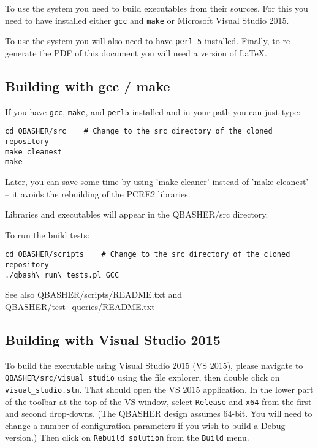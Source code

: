 \documentclass{article}
\begin{document}
To use the system you need to build executables from their sources.
For this you need to have installed either \texttt{gcc} and
\texttt{make} or Microsoft Visual Studio 2015.

To use the system you will also need to have \texttt{perl 5}
installed.  Finally, to re-generate the PDF of this document you will
need a version of LaTeX.

\subsection{Building with gcc / make}

If you have \texttt{gcc}, \texttt{make}, and \texttt{perl5} installed
and in your path you can just type:

\begin{verbatim}
cd QBASHER/src    # Change to the src directory of the cloned repository
make cleanest
make
\end{verbatim}

Later, you can save some time by using 'make cleaner' instead of 'make
cleanest' -- it avoids the rebuilding of the PCRE2 libraries.

Libraries and executables will appear in the QBASHER/src directory.

\noindent To run the build tests:

\begin{verbatim}
cd QBASHER/scripts    # Change to the src directory of the cloned repository
./qbash\_run\_tests.pl GCC
\end{verbatim}

See also QBASHER/scripts/README.txt and QBASHER/test\_queries/README.txt


\subsection{Building with Visual Studio 2015}

To build the executable using Visual Studio 2015 (VS 2015), please navigate to
\texttt{QBASHER/src/visual\_studio} using the file explorer, then
double click on \texttt{visual\_studio.sln}. That should open the VS
2015 application.  In the lower part of the toolbar at the top
of the VS window, select \texttt{Release} and \texttt{x64} from the
first and second drop-downs.  (The QBASHER design assumes 64-bit.
You will need to change a number of configuration parameters if you
wish to build a Debug version.)
Then click on \texttt{Rebuild solution}
from the \texttt{Build} menu.  
\end{document}
